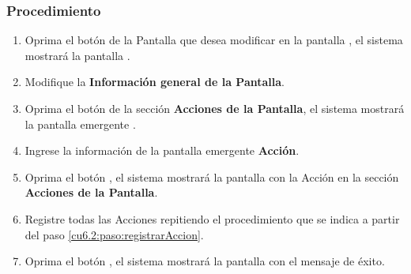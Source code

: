 \subsubsection{Procedimiento}
\begin{enumerate}
	\item Oprima el botón \btnEditar de la Pantalla que desea modificar en la pantalla , el sistema mostrará la pantalla . 

	
	\item Modifique la \textbf{Información general de la Pantalla}.
	
	\item Oprima el botón  de la sección \textbf{Acciones de la Pantalla}, el sistema mostrará la pantalla emergente . \label{cu6.2:paso:registrarAccion}
	
	\item Ingrese la información de la pantalla emergente \textbf{Acción}.
	
	\item Oprima el botón , el sistema mostrará la pantalla  con la Acción en la sección \textbf{Acciones de la Pantalla}.
	
	\item Registre todas las Acciones repitiendo el procedimiento que se indica a partir del paso \ref{cu6.2:paso:registrarAccion}.
	
	\item Oprima el botón , el sistema mostrará la pantalla  con el mensaje de éxito.
\end{enumerate}


